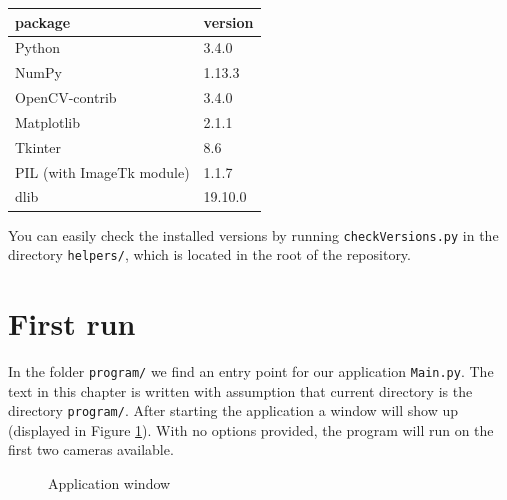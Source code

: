 \begin{center}
\begin{tabular}{l l}
	package	&	version 	\\ \hline
	Python	&	3.4.0 		\\
	NumPy	&	1.13.3 		\\
	OpenCV-contrib	&	3.4.0 	\\ 
	Matplotlib &	2.1.1 		\\
	Tkinter	&	8.6 		\\
	PIL (with ImageTk module)	&	1.1.7 		\\
	dlib	&	19.10.0
\end{tabular}
\end{center}

You can easily check the installed versions by running \verb+checkVersions.py+ in
the directory \verb+helpers/+, which is located in the root of the repository.

\section{First run}

In the folder \verb+program/+ we find an entry point for our application
\verb+Main.py+. The text in this chapter is written with assumption that
current directory is the directory \verb+program/+. After starting the
application a window will show up (displayed in Figure \ref{fig:application}).
With no options provided, the program will run on the first two cameras
available.

\begin{figure}
	\caption{Application window}
	\label{fig:application}
\end{figure}

